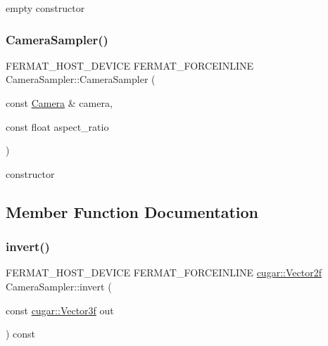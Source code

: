 empty constructor \mbox{\label{struct_camera_sampler_a9d018f4ac9bbd0e93bfcc283ab915eeb}} 
\subsubsection{\texorpdfstring{Camera\+Sampler()}{CameraSampler()}\hspace{0.1cm}{\footnotesize\ttfamily [2/2]}}
{\footnotesize\ttfamily F\+E\+R\+M\+A\+T\+\_\+\+H\+O\+S\+T\+\_\+\+D\+E\+V\+I\+CE F\+E\+R\+M\+A\+T\+\_\+\+F\+O\+R\+C\+E\+I\+N\+L\+I\+NE Camera\+Sampler\+::\+Camera\+Sampler (\begin{DoxyParamCaption}\item[{const \hyperlink{struct_camera}{Camera} \&}]{camera,  }\item[{const float}]{aspect\+\_\+ratio }\end{DoxyParamCaption})\hspace{0.3cm}{\ttfamily [inline]}}

constructor 

\subsection{Member Function Documentation}
\mbox{\label{struct_camera_sampler_a347623323319a7111f933d4af6ac2d19}} 
\subsubsection{\texorpdfstring{invert()}{invert()}\hspace{0.1cm}{\footnotesize\ttfamily [1/2]}}
{\footnotesize\ttfamily F\+E\+R\+M\+A\+T\+\_\+\+H\+O\+S\+T\+\_\+\+D\+E\+V\+I\+CE F\+E\+R\+M\+A\+T\+\_\+\+F\+O\+R\+C\+E\+I\+N\+L\+I\+NE \hyperlink{structcugar_1_1_vector}{cugar\+::\+Vector2f} Camera\+Sampler\+::invert (\begin{DoxyParamCaption}\item[{const \hyperlink{structcugar_1_1_vector}{cugar\+::\+Vector3f}}]{out }\end{DoxyParamCaption}) const\hspace{0.3cm}{\ttfamily [inline]}}

